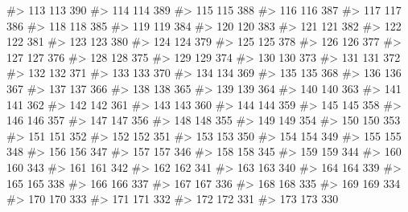 \documentclass[
  letterpaper,
  DIV=11,
  numbers=noendperiod]{scrreprt}
\newenvironment{Shaded}{\begin{snugshade}}{\end{snugshade}}
\newcommand{\CommentTok}[1]{\textcolor[rgb]{0.37,0.37,0.37}{#1}}
\begin{document}
\begin{Shaded}
\begin{Highlighting}[]
\CommentTok{\#\textgreater{} 113 113  390}
\CommentTok{\#\textgreater{} 114 114  389}
\CommentTok{\#\textgreater{} 115 115  388}
\CommentTok{\#\textgreater{} 116 116  387}
\CommentTok{\#\textgreater{} 117 117  386}
\CommentTok{\#\textgreater{} 118 118  385}
\CommentTok{\#\textgreater{} 119 119  384}
\CommentTok{\#\textgreater{} 120 120  383}
\CommentTok{\#\textgreater{} 121 121  382}
\CommentTok{\#\textgreater{} 122 122  381}
\CommentTok{\#\textgreater{} 123 123  380}
\CommentTok{\#\textgreater{} 124 124  379}
\CommentTok{\#\textgreater{} 125 125  378}
\CommentTok{\#\textgreater{} 126 126  377}
\CommentTok{\#\textgreater{} 127 127  376}
\CommentTok{\#\textgreater{} 128 128  375}
\CommentTok{\#\textgreater{} 129 129  374}
\CommentTok{\#\textgreater{} 130 130  373}
\CommentTok{\#\textgreater{} 131 131  372}
\CommentTok{\#\textgreater{} 132 132  371}
\CommentTok{\#\textgreater{} 133 133  370}
\CommentTok{\#\textgreater{} 134 134  369}
\CommentTok{\#\textgreater{} 135 135  368}
\CommentTok{\#\textgreater{} 136 136  367}
\CommentTok{\#\textgreater{} 137 137  366}
\CommentTok{\#\textgreater{} 138 138  365}
\CommentTok{\#\textgreater{} 139 139  364}
\CommentTok{\#\textgreater{} 140 140  363}
\CommentTok{\#\textgreater{} 141 141  362}
\CommentTok{\#\textgreater{} 142 142  361}
\CommentTok{\#\textgreater{} 143 143  360}
\CommentTok{\#\textgreater{} 144 144  359}
\CommentTok{\#\textgreater{} 145 145  358}
\CommentTok{\#\textgreater{} 146 146  357}
\CommentTok{\#\textgreater{} 147 147  356}
\CommentTok{\#\textgreater{} 148 148  355}
\CommentTok{\#\textgreater{} 149 149  354}
\CommentTok{\#\textgreater{} 150 150  353}
\CommentTok{\#\textgreater{} 151 151  352}
\CommentTok{\#\textgreater{} 152 152  351}
\CommentTok{\#\textgreater{} 153 153  350}
\CommentTok{\#\textgreater{} 154 154  349}
\CommentTok{\#\textgreater{} 155 155  348}
\CommentTok{\#\textgreater{} 156 156  347}
\CommentTok{\#\textgreater{} 157 157  346}
\CommentTok{\#\textgreater{} 158 158  345}
\CommentTok{\#\textgreater{} 159 159  344}
\CommentTok{\#\textgreater{} 160 160  343}
\CommentTok{\#\textgreater{} 161 161  342}
\CommentTok{\#\textgreater{} 162 162  341}
\CommentTok{\#\textgreater{} 163 163  340}
\CommentTok{\#\textgreater{} 164 164  339}
\CommentTok{\#\textgreater{} 165 165  338}
\CommentTok{\#\textgreater{} 166 166  337}
\CommentTok{\#\textgreater{} 167 167  336}
\CommentTok{\#\textgreater{} 168 168  335}
\CommentTok{\#\textgreater{} 169 169  334}
\CommentTok{\#\textgreater{} 170 170  333}
\CommentTok{\#\textgreater{} 171 171  332}
\CommentTok{\#\textgreater{} 172 172  331}
\CommentTok{\#\textgreater{} 173 173  330}

\end{Highlighting}
\end{Shaded}
\end{document}
